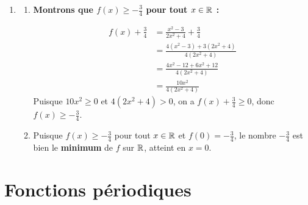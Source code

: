 \documentclass[10pt, a4paper]{article}
\begin{document}
\begin{Solution}[APPLICATION][16]
\begin{enumerate}[leftmargin=*,itemsep=0.5pt]
\begin{enumerate}[leftmargin=*,itemsep=0.5pt]
        \begin{align*}
            \frac{1}{2} - f(x) &= \frac{1}{2} - \frac{x^2 - 3}{2x^2 + 4} \\[6pt]
                                &= \frac{(2x^2 + 4) - 2(x^2 - 3)}{2(2x^2 + 4)} \\[6pt]
                                &= \frac{2x^2 + 4 - 2x^2 + 6}{2(2x^2 + 4)} \\[6pt]
                                &= \frac{10}{2(2x^2 + 4)}
        \end{align*}
        Puisque $10 > 0$ et $2(2x^2+4) > 0$, on a $\frac{1}{2} - f(x) > 0$, donc $f(x) < \frac{1}{2}$

        \item Puisque l'équation $f(x) = \frac{1}{2}$ n'admet aucune solution dans $\R$, le nombre $\frac{1}{2}$ \textbf{n'est pas un maximum} de $f$ sur $\R$.
    \end{enumerate}

    \item
    \begin{enumerate}[leftmargin=*,itemsep=0.5pt]
        \item \textbf{Montrons que $f(x) \geq -\frac{3}{4}$ pour tout $x \in \mathbb{R}$ :}

        \begin{align*}
            f(x) + \frac{3}{4} &= \frac{x^2 - 3}{2x^2 + 4} + \frac{3}{4} \\[6pt]
                                 &= \frac{4(x^2 - 3) + 3(2x^2 + 4)}{4(2x^2 + 4)} \\[6pt]
                                 &= \frac{4x^2 - 12 + 6x^2 + 12}{4(2x^2 + 4)} \\[6pt]
                                 &= \frac{10x^2}{4(2x^2 + 4)}
        \end{align*}
        Puisque $10x^2 \geq 0$ et $4(2x^2+4) > 0$, on a $f(x) + \frac{3}{4} \geq 0$, donc $f(x) \geq -\frac{3}{4}$.

        \item Puisque $f(x) \geq -\frac{3}{4}$ pour tout $x \in \mathbb{R}$ et $f(0) = -\frac{3}{4}$, le nombre $-\frac{3}{4}$ est bien le \textbf{minimum} de $f$ sur $\R$, atteint en $x = 0$.
    \end{enumerate}
\end{enumerate}
\end{Solution}



\section{Fonctions périodiques }
\end{document}
